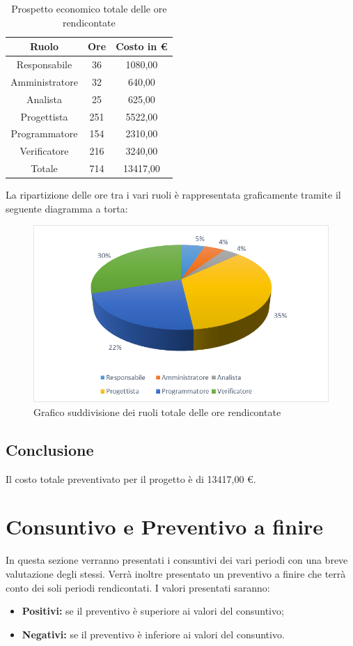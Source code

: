 \documentclass[./PianodiProgetto.tex]{subfiles}
\begin{document}
\begin{table}[H]
	\centering
	\begin{tabular}{|c|c|c|}
		\hline
		Ruolo&Ore&Costo in \euro{} \\ \hline
		Responsabile&36&1080,00 \\ \hline
		Amministratore&32&640,00 \\ \hline
		Analista&25&625,00 \\ \hline
		Progettista&251&5522,00 \\ \hline
		Programmatore&154&2310,00 \\ \hline
		Verificatore&216&3240,00 \\ \hline
		Totale&714&13417,00 \\ \hline
	\end{tabular}
	\caption{Prospetto economico totale delle ore rendicontate}
\end{table}

La ripartizione delle ore tra i vari ruoli è rappresentata graficamente tramite il seguente diagramma a torta:

\begin{figure}[H]
	\centering
	\includegraphics[width=1\linewidth]{img/grafici/OreRendicontateProspettoEconomico}
	\caption{Grafico suddivisione dei ruoli totale delle ore rendicontate}
	\label{fig:ore-rendicontate-prospetto-economico}
\end{figure}

\section{Conclusione}
Il costo totale preventivato per il progetto è di 13417,00 \euro{}.

\chapter{Consuntivo e Preventivo a finire}
In questa sezione verranno presentati i consuntivi dei vari periodi con una
breve valutazione degli stessi. Verrà inoltre presentato un preventivo a finire
che terrà conto dei soli periodi rendicontati. I valori presentati saranno:
\begin{itemize}
\item \textbf{Positivi:} se il preventivo è superiore ai valori del consuntivo;
\item \textbf{Negativi:} se il preventivo è inferiore ai valori del consuntivo.
\end{itemize}
\end{document}
